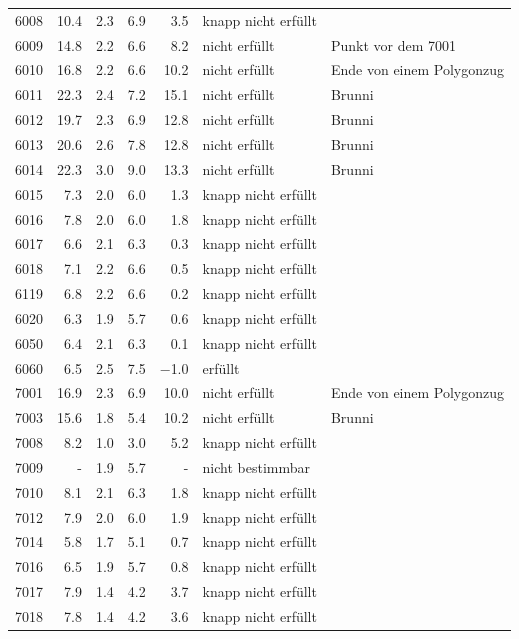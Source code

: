 {\begin{longtable}{p{1.6cm} r r r r l p{3.6cm}}
        6008 & 10.4 & 2.3 & 6.9 & 3.5 & knapp nicht erfüllt &  \\
        6009 & 14.8 & 2.2 & 6.6 & 8.2 & nicht erfüllt & Punkt vor dem 7001 \\
        6010 & 16.8 & 2.2 & 6.6 & 10.2 & nicht erfüllt & Ende von einem Polygonzug \\
        6011 & 22.3 & 2.4 & 7.2 & 15.1 & nicht erfüllt & Brunni \\
        6012 & 19.7 & 2.3 & 6.9 & 12.8 & nicht erfüllt & Brunni \\
        6013 & 20.6 & 2.6 & 7.8 & 12.8 & nicht erfüllt & Brunni \\
        6014 & 22.3 & 3.0 & 9.0 & 13.3 & nicht erfüllt & Brunni \\
        6015 & 7.3 & 2.0 & 6.0 & 1.3 & knapp nicht erfüllt &  \\
        6016 & 7.8 & 2.0 & 6.0 & 1.8 & knapp nicht erfüllt &  \\
        6017 & 6.6 & 2.1 & 6.3 & 0.3 & knapp nicht erfüllt &  \\
        6018 & 7.1 & 2.2 & 6.6 & 0.5 & knapp nicht erfüllt &  \\
        6119 & 6.8 & 2.2 & 6.6 & 0.2 & knapp nicht erfüllt &  \\
        6020 & 6.3 & 1.9 & 5.7 & 0.6 & knapp nicht erfüllt &  \\
        6050 & 6.4 & 2.1 & 6.3 & 0.1 & knapp nicht erfüllt &  \\
        6060 & 6.5 & 2.5 & 7.5 & $-$1.0 & erfüllt &  \\
        7001 & 16.9 & 2.3 & 6.9 & 10.0 & nicht erfüllt & Ende von einem Polygonzug \\
        7003 & 15.6 & 1.8 & 5.4 & 10.2 & nicht erfüllt & Brunni \\
        7008 & 8.2 & 1.0 & 3.0 & 5.2 & knapp nicht erfüllt &  \\
        7009 & - & 1.9 & 5.7 & - & nicht bestimmbar &  \\
        7010 & 8.1 & 2.1 & 6.3 & 1.8 & knapp nicht erfüllt &  \\
        7012 & 7.9 & 2.0 & 6.0 & 1.9 & knapp nicht erfüllt &  \\
        7014 & 5.8 & 1.7 & 5.1 & 0.7 & knapp nicht erfüllt &  \\
        7016 & 6.5 & 1.9 & 5.7 & 0.8 & knapp nicht erfüllt &  \\
        7017 & 7.9 & 1.4 & 4.2 & 3.7 & knapp nicht erfüllt &  \\
        7018 & 7.8 & 1.4 & 4.2 & 3.6 & knapp nicht erfüllt &  \\

\end{longtable}}
